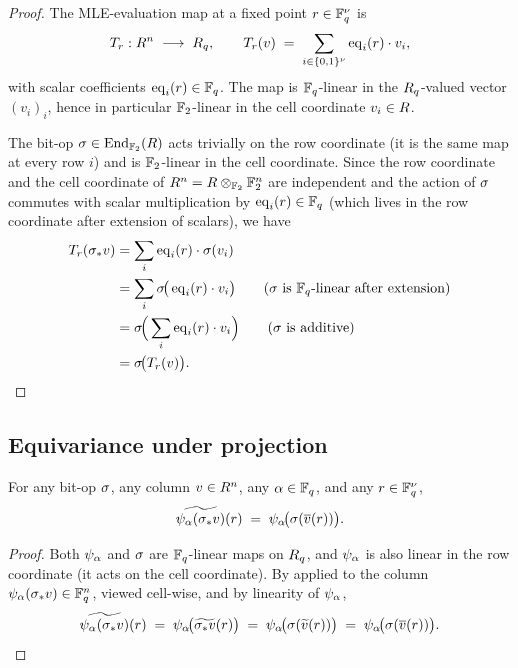 \begin{proof}
The MLE-evaluation map at a fixed point $r \in \mathbb{F}_q^{\nu}$ is
\[
  T_r : R^n \;\longrightarrow\; R_q,
  \qquad
  T_r(v) \;=\; \sum_{i \in \{0,1\}^{\nu}} \operatorname{eq}_i(r) \cdot v_i,
\]
with scalar coefficients $\operatorname{eq}_i(r) \in \mathbb{F}_q$. The map is
$\mathbb{F}_q$-linear in the $R_q$-valued vector $(v_i)_i$, hence in
particular $\mathbb{F}_2$-linear in the cell coordinate $v_i \in R$.

The bit-op $\sigma \in \operatorname{End}_{\mathbb{F}_2}(R)$ acts trivially on the
row coordinate (it is the same map at every row $i$) and is
$\mathbb{F}_2$-linear in the cell coordinate. Since the row coordinate and
the cell coordinate of $R^n = R \otimes_{\mathbb{F}_2} \mathbb{F}_2^n$
are independent and the action of $\sigma$ commutes with scalar
multiplication by $\operatorname{eq}_i(r) \in \mathbb{F}_q$ (which lives in the row
coordinate after extension of scalars), we have
\begin{align*}
  T_r(\sigma_* v)
  &= \sum_{i} \operatorname{eq}_i(r) \cdot \sigma(v_i) \\
  &= \sum_{i} \sigma\!\big(\operatorname{eq}_i(r) \cdot v_i\big)
     \qquad \text{($\sigma$ is $\mathbb{F}_q$-linear after extension)} \\
  &= \sigma\!\Big(\sum_{i} \operatorname{eq}_i(r) \cdot v_i\Big)
     \qquad \text{($\sigma$ is additive)} \\
  &= \sigma\!\big(T_r(v)\big).
\end{align*}
\end{proof}

\subsection{Equivariance under projection}

\begin{corollary}
\label{cor:projected-equivariance}
For any bit-op $\sigma$, any column $v \in R^n$, any
$\alpha \in \mathbb{F}_q$, and any $r \in \mathbb{F}_q^{\nu}$,
\[
  \widetilde{\psi_{\alpha}(\sigma_* v)}(r) \;=\; \psi_{\alpha}\!\big(\sigma(\overline{v}(r))\big).
\]
\end{corollary}

\begin{proof}
Both $\psi_{\alpha}$ and $\sigma$ are $\mathbb{F}_q$-linear maps on $R_q$, and
$\psi_{\alpha}$ is also linear in the row coordinate (it acts on the cell
coordinate). By  applied to the column
$\psi_{\alpha}(\sigma_* v) \in \mathbb{F}_q^n$, viewed cell-wise, and by linearity of
$\psi_{\alpha}$,
\[
  \widetilde{\psi_{\alpha}(\sigma_* v)}(r)
  \;=\; \psi_{\alpha}\!\big(\widetilde{\sigma_* v}(r)\big)
  \;=\; \psi_{\alpha}\!\big(\sigma(\widetilde{v}(r))\big)
  \;=\; \psi_{\alpha}\!\big(\sigma(\overline{v}(r))\big).
\]
\end{proof}

